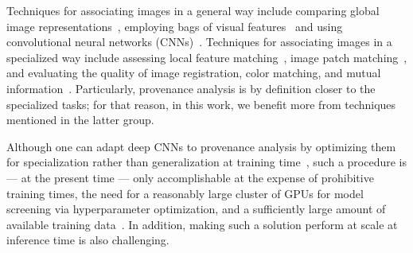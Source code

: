 Techniques for associating images in a general way include comparing global image representations~\cite{Deselaers_2010, oliva_2006}, employing bags of visual features~\cite{avila_2013, nanni2013heterogeneous} and using convolutional neural networks (CNNs)~\cite{szegedy_2015, krizhevsky_2017, zhou2014learning, wang2017knowledge}.
Techniques for associating images in a specialized way include assessing local feature matching~\cite{maresca_2013, yang2015ransac, joly_2007, huang_2008,silva_2015}, image patch matching~\cite{milford2014condition}, and evaluating the quality of image registration, color matching, and mutual information~\cite{Costa_2017, bharati2017uphy}.
Particularly, provenance analysis is by definition closer to the specialized tasks; for that reason, in this work, we benefit more from techniques mentioned in the latter group.

Although one can adapt deep CNNs to provenance analysis by optimizing them for specialization rather than generalization at training time~\cite{zagoruyko_2015, simoserra_2015}, such a procedure is --- at the present time --- only accomplishable at the expense of prohibitive training times, the need for a reasonably large cluster of GPUs for model screening via hyperparameter optimization, and a sufficiently large amount of available training data~\cite{chollet_2017}.
In addition, making such a solution perform at scale at inference time is also challenging.



